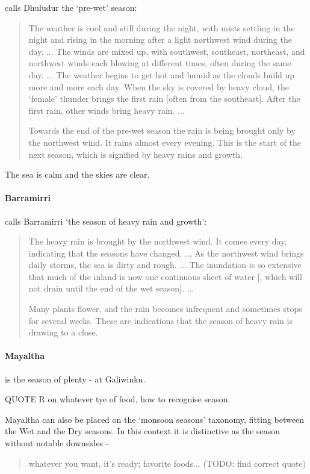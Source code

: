 \citet{davis1989} calls Dhuludur the `pre-wet' season:
\blockquote{
    The weather is cool and still during the night, with mists settling in the night
    and rising in the morning after a light northwest wind during the day. ...
    The winds are mixed up, with southwest, southeast, northeast, and northwest winds
    each blowing at different times, often during the same day. ...
    The weather begins to get hot and humid as the clouds build up more and more each day.
    When the sky is covered by heavy cloud, the `female' thunder brings the first rain [often from the southeast].
    After the first rain, other winds bring heavy rain. ...
    
    Towards the end of the pre-wet season the rain is being brought only by the northwest wind.
    It rains almost every evening.
    This is the start of the next season, which is signified by heavy rains and growth.
}

The sea is calm and the skies are clear.


\paragraph{Barramirri}

\citet{davis1989} calls Barramirri `the season of heavy rain and growth':
\blockquote{
    The heavy rain is brought by the northwest wind. It comes every day,
    indicating that the seasons have changed. ...
    As the northwest wind brings daily storms, the sea is dirty and rough. ...
    The inundation is so extensive that much of the inland is now one continuous sheet of water
    [, which will not drain until the end of the wet season]. ...
    
    Many plants flower, and the rain becomes infrequent and sometimes stops for several weeks.
    These are indications that the season of heavy rain is drawing to a close.
}


\paragraph{Mayaltha} is the season of plenty - at Galiwinku.  

QUOTE R on whatever tye of food, how to recognise season.

Mayaltha can also be placed on the `monsoon seasons' taxonomy, fitting
between the Wet and the Dry seasons.  In this context it is distinctive
as the season without notable downsides - \blockquote{
    whatever you want, it's ready; favorite foods... (TODO: find correct quote)
}.


